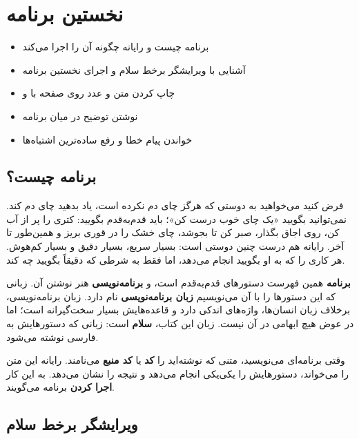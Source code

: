 \chapter{نخستین برنامه}\label{ch:first}

\begin{goals}
\begin{itemize}
  \item برنامه چیست و رایانه چگونه آن را اجرا می‌کند
  \item آشنایی با ویرایشگر برخط سلام و اجرای نخستین برنامه
  \item چاپ کردن متن و عدد روی صفحه با  و 
  \item نوشتن توضیح در میان برنامه
  \item خواندن پیام خطا و رفع ساده‌ترین اشتباه‌ها
\end{itemize}
\end{goals}

\section{برنامه چیست؟}

فرض کنید می‌خواهید به دوستی که هرگز چای دم نکرده است، یاد بدهید چای دم
کند. نمی‌توانید بگویید «یک چای خوب درست کن»؛ باید قدم‌به‌قدم بگویید: کتری
را پر از آب کن، روی اجاق بگذار، صبر کن تا بجوشد، چای خشک را در قوری بریز
و همین‌طور تا آخر. رایانه هم درست چنین دوستی است: بسیار سریع، بسیار دقیق
و بسیار کم‌هوش. هر کاری را که به او بگویید انجام می‌دهد، اما فقط به شرطی که
دقیقاً بگویید چه کند.

\textbf{برنامه} همین فهرست دستورهای قدم‌به‌قدم است، و \textbf{برنامه‌نویسی}
هنر نوشتن آن. زبانی که این دستورها را با آن می‌نویسیم
\textbf{زبان برنامه‌نویسی} نام دارد. زبان برنامه‌نویسی، برخلاف زبان انسان‌ها،
واژه‌های اندکی دارد و قاعده‌هایش بسیار سخت‌گیرانه است؛ اما در عوض هیچ
ابهامی در آن نیست. زبان این کتاب، \textbf{سلام} است: زبانی که دستورهایش به
فارسی نوشته می‌شود.

\begin{note}
وقتی برنامه‌ای می‌نویسید، متنی که نوشته‌اید را \textbf{کد} یا
\textbf{کد منبع} می‌نامند. رایانه این متن را می‌خواند، دستورهایش را یکی‌یکی
انجام می‌دهد و نتیجه را نشان می‌دهد. به این کار \textbf{اجرا کردن} برنامه
می‌گویند.
\end{note}

\section{ویرایشگر برخط سلام}

